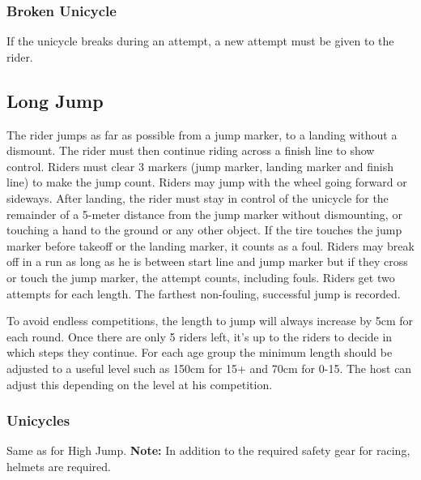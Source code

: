 \subsubsection{Broken Unicycle}
If the unicycle breaks during an attempt, a new attempt must be given to the rider.

\subsection{Long Jump}
The rider jumps as far as possible from a jump marker, to a landing without a dismount.
The rider must then continue riding across a finish line to show control.
Riders must clear 3 markers (jump marker, landing marker and finish line) to make the jump count.
Riders may jump with the wheel going forward or sideways.
After landing, the rider must stay in control of the unicycle for the remainder of a 5-meter distance from the jump marker without dismounting, or touching a hand to the ground or any other object.
If the tire touches the jump marker before takeoff or the landing marker, it counts as a foul.
Riders may break off in a run as long as he is between start line and jump marker but if they cross or touch the jump marker, the attempt counts, including fouls.
Riders get two attempts for each length.
The farthest non-fouling, successful jump is recorded.

To avoid endless competitions, the length to jump will always increase by 5cm for each round.
Once there are only 5 riders left, it's up to the riders to decide in which steps they continue.
For each age group the minimum length should be adjusted to a useful level such as 150cm for 15+ and 70cm for 0-15.
The host can adjust this depending on the level at his competition.

\subsubsection{Unicycles}
Same as for High Jump.
\textbf{Note:} In addition to the required safety gear for racing, helmets are required.

